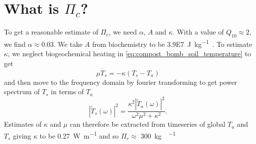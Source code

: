 \section{What is $\Pi_c$?}
To get a reasonable estimate of $\Pi_c$, we need $\alpha$, $A$ and $\kappa$. With a value of $Q_{10} \approx 2$, we find $\alpha \approx 0.03$.
We take $A$ from biochemistry to be \SI{3.9E7}{\joule\per\kilo\gram\carbon}. To estimate $\kappa$, we neglect biogeochemical heating
in \cref{eq:compost_bomb_soil_temperature} to get
\begin{equation}
  \label{eq:soil_temp_no_biogeo}
  \mu \dot{T_s} = -\kappa \left( T_s -T_a \right)
\end{equation}
and then move to the frequency domain by fourier transforming to get power spectrum of $T_s$ in terms of $T_a$
\begin{equation}
  \label{eq:power_spectrum_of_Ts}
  \left| \tilde{T}_s\left(\omega\right)\right|^2 = \frac{\kappa^2 \left| \tilde{T}_a\left(\omega\right)\right|^2}{\omega^2 \mu^2 + \kappa^2}.
    \end{equation}
Estimates of $\kappa$ and $\mu$ can therefore be extracted from timeseries of global $T_a$ and $T_s$ giving $\kappa$ to be \SI{0.27}{\watt\per\meter}
and so $\Pi_c \approx$ \SI{300}{\kilo\gram\carbon\per\year}

